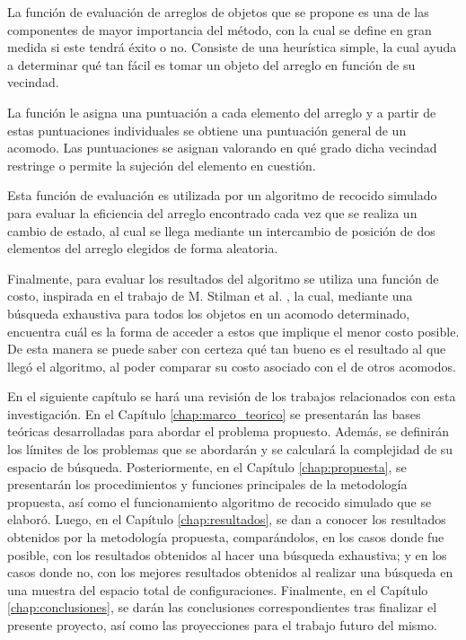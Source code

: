 La función de evaluación de arreglos de objetos que se propone es una de las componentes de mayor importancia del método, con la cual se define en gran medida si este tendrá éxito o no.
Consiste de una heurística simple, la cual ayuda a determinar qué tan fácil es tomar un objeto del arreglo en función de su vecindad.

La función le asigna una puntuación a cada elemento del arreglo y a partir de estas puntuaciones individuales se obtiene una puntuación general de un acomodo.
Las puntuaciones se asignan valorando en qué grado dicha vecindad restringe o permite la sujeción del elemento en cuestión.

Esta función de evaluación es utilizada por un algoritmo de recocido simulado para evaluar la eficiencia del arreglo encontrado cada vez que se realiza un cambio de estado, al cual se llega mediante un intercambio de posición de dos elementos del arreglo elegidos de forma aleatoria.

Finalmente, para evaluar los resultados del algoritmo se utiliza una función de costo, inspirada en el trabajo de M. Stilman et al. \cite{4209604}, la cual, mediante una búsqueda exhaustiva para todos los objetos en un acomodo determinado, encuentra cuál es la forma de acceder a estos que implique el menor costo posible.
De esta manera se puede saber con certeza qué tan bueno es el resultado al que llegó el algoritmo, al poder comparar su costo asociado con el de otros acomodos.

En el siguiente capítulo se hará una revisión de los trabajos relacionados con esta investigación.
En el Capítulo \ref{chap:marco_teorico} se presentarán las bases teóricas desarrolladas para abordar el problema propuesto.
Además, se definirán los límites de los problemas que se abordarán y se calculará la complejidad de su espacio de búsqueda.
Posteriormente, en el Capítulo \ref{chap:propuesta}, se presentarán los procedimientos y funciones principales de la metodología propuesta, así como el funcionamiento algoritmo de recocido simulado que se elaboró.
Luego, en el Capítulo \ref{chap:resultados}, se dan a conocer los resultados obtenidos por la metodología propuesta, comparándolos, en los casos donde fue posible, con los resultados obtenidos al hacer una búsqueda exhaustiva; y en los casos donde no, con los mejores resultados obtenidos al realizar una búsqueda en una muestra del espacio total de configuraciones.
Finalmente, en el Capítulo \ref{chap:conclusiones}, se darán las conclusiones correspondientes tras finalizar el presente proyecto, así como las proyecciones para el trabajo futuro del mismo.